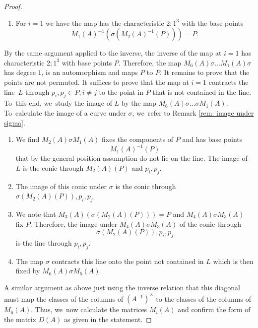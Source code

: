 \documentclass[JEP,XML,SOM,Unicode,NoFloatCountersInSection, NoEqCountersInSection,published]{cedram}
\theoremstyle{definition}
\begin{document}
\begin{proof}
\begin{enumerate}
\[
M_2(A)^{-1}(\sigma(M_3(A)^{-1}(P))) = P
\]
of multiplicity $2$.
\item For $i = 1$ we have the map has the characteristic $2;1^3$ with the base points
\[
M_1(A)^{-1}(\sigma(M_2(A)^{-1}(P))) = P.
\]
\end{enumerate}
By the same argument applied to the inverse, the inverse of the map at $i = 1$ has characteristic $2;1^3$ with base points $P$. Therefore, the map $M_6(A) \sigma \dots M_1(A) \sigma$ has degree $1$, \ie is an automorphism and maps $P$ to $P$. It remains to prove that the points are not permuted. It suffices to prove that the map at $i = 1$ contracts the line~$L$ through $p_i, p_j \in P, i \neq j$ to the point in $P$ that is not contained in the line. To~this end, we~study the image of $L$ by the map $M_6(A) \sigma \dots \sigma M_1(A)$. To~calculate the image of a curve under $\sigma$, we~refer to Remark \ref{rem: image under sigma}.
\begin{enumerate}
\item We find $M_2(A) \sigma M_1(A)$ fixes the components of $P$ and has base points
\[
M_1(A)^{-1}(P)
\]
that by the general position assumption do not lie on the line. The image of $L$ is the conic through $M_2(A)(P)$ and $p_i,p_j$.
\item The image of this conic under $\sigma$ is the conic through $\sigma(M_2(A)(P)), p_i, p_j$.
\item We note that $M_3(A)(\sigma(M_2(A)(P))) = P$ and $M_4(A) \sigma M_3(A)$ fix $P$. Therefore, the image under $M_4(A) \sigma M_3(A)$ of the conic through
\[
\sigma(M_2(A)(P)), p_i, p_j
\]
is the line through $p_i,p_j$.
\item The map $\sigma$ contracts this line onto the point not contained in $L$ which is then fixed by $M_6(A) \sigma M_5(A)$.
\end{enumerate}

A similar argument as above just using the inverse relation that this diagonal must map the classes of the columns of $(A^{-1})^{\Sigma}$ to the classes of the columns of $M_6(A)$. Thus, we~now calculate the matrices $M_i(A)$ and confirm the form of the matrix $D(A)$ as given in the statement.


\end{proof}
\end{document}
